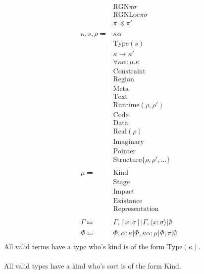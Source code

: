 \documentclass {article}
\begin{document}
\begin{align*}
& \text{RGN} \pi \sigma \tag*{[Region Transformer]} \\
& \text{RGNLoc} \pi \sigma \tag*{[Reference]}\\
& \pi \preceq \pi' \tag*{[Region Scoping Constraint]} \\
\\
\kappa, s, \rho \Coloneqq &  \kappa \alpha \tag*{[Kind Variable]} \\
& \text{Type} (s) \tag*{[Type]} \\
& \kappa \to \kappa' \tag*{[Higher Kinded]} \\
& \forall \kappa \alpha : \mu. \kappa \tag*{[Poly Kinded]}\\
& \text{Constraint} \tag*{[Constraint]} \\
& \text{Region} \tag*{[Region]} \\
& \text{Meta} \tag*{[Meta Stage]}\\
& \text{Text} \tag*{[Symbol Stage]} \\
& \text{Runtime} (\rho, \rho') \tag*{[Runtime Stage]}\\
& \text{Code} \tag*{[Code Impact]}\\
& \text{Data} \tag*{[Data Impact]}\\
& \text{Real} (\rho) \tag*{[Real Existance]} \\
& \text{Imaginary} \tag*{[Imaginary Existance]} \\
& \text{Pointer} \tag*{[Pointer Representation]}\\
& \text{Structure} \{ \rho, \rho', \dots \} \tag*{[Structure Representation]} \\
\\
\mu \Coloneqq & \text{Kind} \\
& \text{Stage} \\
& \text{Impact} \\
& \text{Existance} \\
& \text{Representation} \\
\\
\Gamma \Coloneqq & \Gamma, [x : \sigma] | \Gamma, \langle x : \sigma \rangle | \emptyset \\
\Phi \Coloneqq & \Phi, \alpha : \kappa | \Phi, \kappa \alpha : \mu | \Phi, \pi|  \emptyset \\
\end{align*}
All valid terms have a type who's kind is of the form $ \text{Type} (\kappa) $. \\
\\
All valid types have a kind who's sort is of the form $ \text{Kind} $.\\
\end{document}
